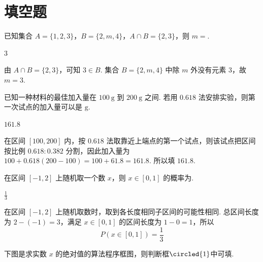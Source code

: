 \section{填空题}

\begin{problem}
已知集合 \(A = \{1, 2, 3\}\)，\(B = \{2, m, 4\}\)，\(A \cap B = \{2, 3\}\)，则 \(m =\)\fillinblank{}.
\end{problem}

\begin{answer}
\(3\)
\end{answer}

\begin{solution}
由 \(A\cap B=\{2,3\}\)，可知 \(3\in B\). 集合 \(B=\{2,m,4\}\) 中除 \(m\) 外没有元素 \(3\)，故 \(m=3\).
\end{solution}

\begin{problem}
已知一种材料的最佳加入量在 \(100 \mathrm{~g}\) 到 \(200 \mathrm{~g}\) 之间. 若用 \(0.618\) 法安排实验，则第一次试点的加入量可以是\fillinblank{} \(\mathrm{g}\).
\end{problem}

\begin{answer}
\(161.8\)
\end{answer}

\begin{solution}
在区间 \([100,200]\) 内，按 \(0.618\) 法取靠近上端点的第一个试点，则该试点把区间按比例 \(0.618\colon 0.382\) 分割，因此加入量为 \(100+0.618(200-100)=100+61.8=161.8\). 所以填 \(161.8\).
\end{solution}

\begin{problem}
在区间 \([-1, 2]\) 上随机取一个数 \(x\)，则 \(x \in [0, 1]\) 的概率为\fillinblank{}.
\end{problem}

\begin{answer}
\(\frac{1}{3}\)
\end{answer}

\begin{solution}
在区间 \([-1,2]\) 上随机取数时，取到各长度相同子区间的可能性相同. 总区间长度为 \(2-(-1)=3\)，满足 \(x\in[0,1]\) 的区间长度为 \(1-0=1\)，所以
\[
P(x\in[0,1])=\frac{1}{3}
\]
\end{solution}

\begin{problem}
下图是求实数 \(x\) 的绝对值的算法程序框图，则判断框\(\circled{1}\)中可填\fillinblank{}.

\end{problem}

